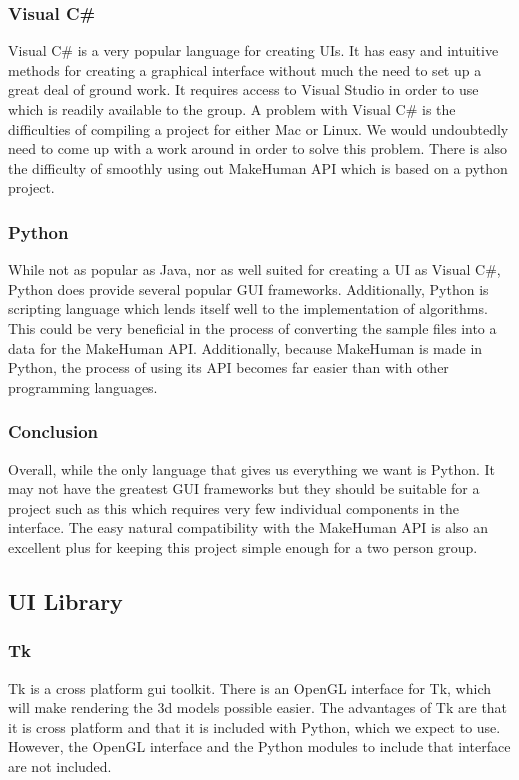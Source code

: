 \documentclass[letterpaper,10pt, onecolumn, draftclsnofoot]{IEEEtran}
\begin{document}
\subsubsection{Visual C\#}
Visual C\# is a very popular language for creating UIs. It has easy and intuitive methods for creating a graphical interface without much the need to set up a great deal of ground work. It requires access to Visual Studio in order to use which is readily available to the group. A problem with Visual C\# is the difficulties of compiling a project for either Mac or Linux. We would undoubtedly need to come up with a work around in order to solve this problem. There is also the difficulty of smoothly using out MakeHuman API which is based on a python project.

\subsubsection{Python}
While not as popular as Java, nor as well suited for creating a UI as Visual C\#, Python does provide several popular GUI frameworks. Additionally, Python is scripting language which lends itself well to the implementation of algorithms. This could be very beneficial in the process of converting the sample files into a data for the MakeHuman API. Additionally, because MakeHuman is made in Python, the process of using its API becomes far easier than with other programming languages.

\subsubsection{Conclusion}
Overall, while the only language that gives us everything we want is Python. It may not have the greatest GUI frameworks but they should be suitable for a project such as this which requires very few individual components in the interface. The easy natural compatibility with the MakeHuman API is also an excellent plus for keeping this project simple enough for a two person group.

\subsection{UI Library}
\subsubsection{Tk}
Tk is a cross platform gui toolkit. There is an OpenGL interface for Tk, which will make rendering the 3d models possible easier. The advantages of Tk are that it is cross platform and that it is included with Python, which we expect to use. However, the OpenGL interface and the Python modules to include that interface are not included. 
\end{document}
